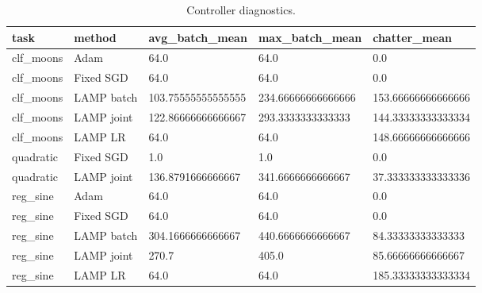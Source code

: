 \begin{table}[t]
\centering
\begin{tabular}{lllll}
\toprule
task & method & avg\_batch\_mean & max\_batch\_mean & chatter\_mean \\ \midrule
clf\_moons & Adam & 64.0 & 64.0 & 0.0 \\
clf\_moons & Fixed SGD & 64.0 & 64.0 & 0.0 \\
clf\_moons & LAMP batch & 103.75555555555555 & 234.66666666666666 & 153.66666666666666 \\
clf\_moons & LAMP joint & 122.86666666666667 & 293.3333333333333 & 144.33333333333334 \\
clf\_moons & LAMP LR & 64.0 & 64.0 & 148.66666666666666 \\
quadratic & Fixed SGD & 1.0 & 1.0 & 0.0 \\
quadratic & LAMP joint & 136.8791666666667 & 341.6666666666667 & 37.333333333333336 \\
reg\_sine & Adam & 64.0 & 64.0 & 0.0 \\
reg\_sine & Fixed SGD & 64.0 & 64.0 & 0.0 \\
reg\_sine & LAMP batch & 304.1666666666667 & 440.6666666666667 & 84.33333333333333 \\
reg\_sine & LAMP joint & 270.7 & 405.0 & 85.66666666666667 \\
reg\_sine & LAMP LR & 64.0 & 64.0 & 185.33333333333334 \\
\bottomrule
\end{tabular}
\caption{Controller diagnostics.}
\end{table}
